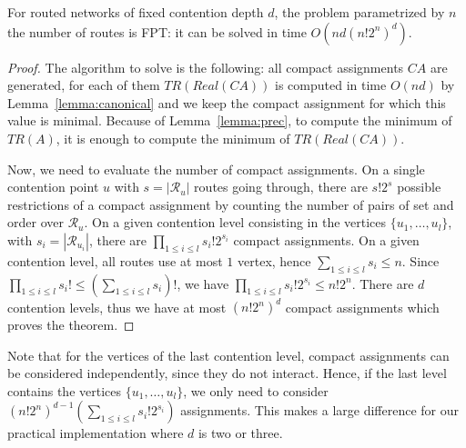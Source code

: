\documentclass[english]{article}
\begin{document}

\begin{theorem}\label{theorem:FPT}
For routed networks of fixed contention depth $d$, the problem \spall parametrized by $n$ the number of routes is FPT: it can be solved in time $O(nd(n!2^{n})^{d})$.
\end{theorem}
\begin{proof}
The algorithm to solve \spall is the following: all compact assignments $CA$ are generated, for each of them $TR(Real(CA))$ is computed in time
$O(nd)$ by Lemma~\ref{lemma:canonical} and we keep the compact assignment for which this value is minimal.  Because of Lemma~\ref{lemma:prec}, to compute the minimum of $TR(A)$, it is enough 
to compute the minimum of $TR(Real(CA))$.

 Now, we need to evaluate the number of compact assignments. 
On a single contention point $u$ with $s = |\mathcal{R}_u|$ routes going through, there are $s!2^s$ possible restrictions of a compact assignment by counting the number of pairs of set and order over $\mathcal{R}_u$.
On a given contention level consisting in the vertices $\{u_1,\dots,u_l\}$, with $s_i = |\mathcal{R}_{u_{i}}|$, there are 
$\prod_{1 \leq i\leq l} s_i!2^{s_i}$ compact assignments. On a given contention level, all routes use at most $1$ vertex, hence $\sum_{1 \leq i\leq l} s_i \leq n$. Since $\prod_{1 \leq i\leq l} s_i! \leq (\sum_{1 \leq i\leq l} s_i)!$, we have $\prod_{1 \leq i\leq l} s_i!2^{s_i} \leq n!2^n$. There are $d$ contention levels, thus we have at most $ (n!2^{n})^{d}$ compact assignments which proves the theorem.
\end{proof}

Note that for the vertices of the last contention level, compact assignments can be considered independently, since
they do not interact. Hence, if the last level contains the vertices $\{u_1,\dots,u_l\}$, we only need to consider $(n!2^{n})^{d-1}(\sum_{1 \leq i\leq l} s_i!2^{s_i})$ assignments. This makes a large difference for our practical implementation where $d$ is two or three.
\end{document}
